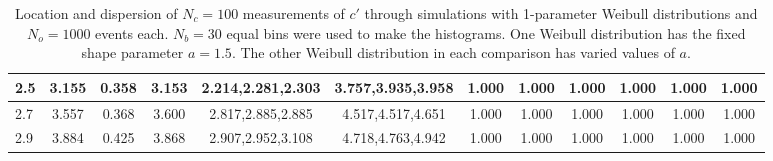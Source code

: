 \begin{table*}[h!]
\begin{center}
\begin{tabular}{| l | c | c | c | c | c | c | c | c | c | c | c |}
2.5 & 3.155 & 0.358 & 3.153 & 2.214,2.281,2.303 & 3.757,3.935,3.958  & 1.000  & 1.000  & 1.000  & 1.000  & 1.000  & 1.000 \\\hline
2.7 & 3.557 & 0.368 & 3.600 & 2.817,2.885,2.885 & 4.517,4.517,4.651  & 1.000  & 1.000  & 1.000  & 1.000  & 1.000  & 1.000 \\\hline
2.9 & 3.884 & 0.425 & 3.868 & 2.907,2.952,3.108 & 4.718,4.763,4.942  & 1.000  & 1.000  & 1.000  & 1.000  & 1.000  & 1.000 \\\hline
\end{tabular}
\caption{Location and dispersion of $N_c=100$
measurements of $c'$ through simulations
with 1-parameter Weibull distributions and $N_o=1000$ events each.
$N_b=30$ equal bins were used to make the histograms.
One Weibull distribution has the fixed shape parameter $a=1.5$.
The other Weibull distribution in each comparison
has varied values of $a$.}
\end{center}
\end{table*}
